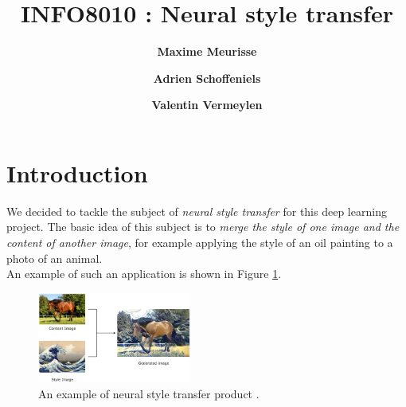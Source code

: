 \documentclass[twocolumn,superscriptaddress,aps]{revtex4-1}
\begin{document}
    
    \title{\Large{INFO8010 : Neural style transfer}}
    \vspace{1cm}
    
    \author{\small{\bf Maxime Meurisse}}
    
    \author{\small{\bf Adrien Schoffeniels}}
    
    \author{\small{\bf Valentin Vermeylen}}
    
    \maketitle
    
    
    
    
    \section{Introduction}
    
    We decided to tackle the subject of \emph{neural style transfer} for this deep learning project. The basic idea of this subject is to \emph{merge the style of one image and the content of another image}, for example applying the style of an oil painting to a photo of an animal.\\
    
    An example of such an application is shown in Figure \ref{fig:introduction.example}.\\
    
    \begin{figure}[ht]
        \centering
        \includegraphics[width=0.45\textwidth]{resources/png/example.png}
        \caption{An example of neural style transfer product \cite{towardsdatascience.com}.}
        \label{fig:introduction.example}
    \end{figure}
    
\end{document}
